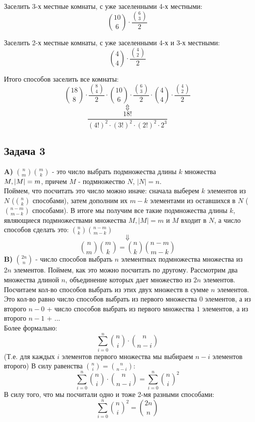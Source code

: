 \documentclass{article}
\begin{document}
Заселить 3-х местные комнаты, с уже заселенными 4-х местными:
$${10 \choose 6} \cdot \frac{ {6 \choose 3}}{2} $$

Заселить 2-х местные комнаты, с уже заселенными 4-х и 3-х местными:
$${4 \choose 4} \cdot \frac{ {4 \choose 2}}{2} $$

Итого способов заселить все комнаты:
$${18 \choose 8} \cdot \frac{ {8 \choose 4}}{2} \cdot {10 \choose 6} \cdot \frac{ {6 \choose 3}}{2} \cdot {4 \choose 4} \cdot \frac{ {4 \choose 2}}{2} $$
$$\Updownarrow$$
$$ \frac{18!}{(4!)^2 \cdot (3!)^2 \cdot  (2!)^2 \cdot 2^3 } $$


\begin{center}
	\subsection*{Задача 3}
\end{center}

\textbf{A)} $ {n \choose m}{m \choose k} $ - это число выбрать подмножества длины $k$ множества $M,\\ |M| = m$, причем $M$ - подмножество $N$, $|N| = n$.\\
Поймем, что посчитать это число можно иначе: сначала выберем $k$ элементов из $N$ (${n \choose k}$ способами), затем дополним их $m - k$ элементами из оставшихся в $N$ (${n - m \choose m - k}$ способами). В итоге мы получим все такие подмножества длины $k$, являющиеся подмножествами множества $M, |M| = m$ и $M$ входит в $N$, а число способов сделать это: ${n \choose k}{n - m \choose m - k}$
$$ \Downarrow $$
$$ {n \choose m}{m \choose k} = {n \choose k}{n - m \choose m - k} $$
\textbf{B)} ${2n \choose n}$ - число способов выбрать $n$ элементных подмножества множества из $2n$ элементов. Поймем, как это можно посчитать по другому. Рассмотрим два множества длиной $n$, объединение которых дает множество из $2n$ элементов. Посчитаем кол-во способов выбрать из этих двух множеств в сумме $n$ элементов. 
Это кол-во равно число способов выбрать из первого множества $0$ элементов, а из второго $n - 0$ + число способов выбрать из первого множества $1$ элементов, а из второго $n - 1$ + ...
\\
Более формально:
	$$ \sum_{i=0}^{n} {n \choose i} \cdot {n \choose n - i}$$
(Т.е. для каждых $i$ элементов первого множества мы выбираем $n - i$ элементов второго)
В силу равенства  $ {n \choose i} = {n \choose n - i} $:
	$$ \sum_{i=0}^{n} {n \choose i} \cdot {n \choose n - i} = \sum_{i=0}^{n} {n \choose i}^2 $$
В силу того, что мы посчитали одно и тоже 2-мя разными способами:
	$$\sum_{i=0}^{n} {n \choose i}^2 =  {2n \choose n} $$
	
\end{document}
